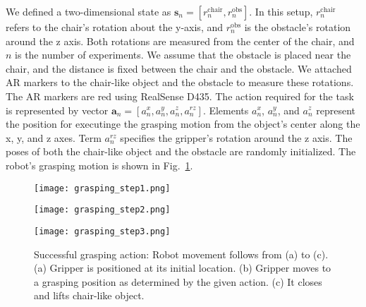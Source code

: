 \documentclass[sn-mathphys-num]{sn-jnl}
\begin{document}
We defined a two-dimensional state as $\mathbf{s}_{n}=[r^\mathrm{chair}_n, r^\mathrm{obs}_n]$.
In this setup, $r^{\mathrm{chair}}_n$ refers to the chair's rotation about the y-axis, and $r^\mathrm{obs}_n$ is the obstacle's rotation around the z axis. Both rotations are measured from the center of the chair, and $n$ is the number of experiments.
We assume that the obstacle is placed near the chair, and the distance is fixed between the chair and the obstacle.
We attached AR markers to the chair-like object and the obstacle to measure these rotations.
The AR markers are red using RealSense D435.
The action required for the task is represented by vector $\mathbf{a}_n=[a^x_n, a^y_n, a^z_n, a^{rz}_n]$.
Elements $a^x_n$, $a^y_n$, and $a^z_n$ represent the position for executinge the grasping motion from the object's center along the x, y, and z axes.
Term $a^{rz}_n$ specifies the gripper's rotation around the z axis.
The poses of both the chair-like object and the obstacle are randomly initialized.
The robot's grasping motion is shown in Fig.~\ref{fig:grasping:grasping}.


\begin{figure}[t]
    \centering
    \begin{minipage}[b]{0.32\linewidth}
        \centering
        \texttt{[image: grasping\_step1.png]}
        \label{fig:grasping:grasping:a}
    \end{minipage}
    \begin{minipage}[b]{0.32\linewidth}
        \centering
        \texttt{[image: grasping\_step2.png]}
        \label{fig:grasping:grasping:b}
    \end{minipage}
    \begin{minipage}[b]{0.32\linewidth}
        \centering
        \texttt{[image: grasping\_step3.png]}
        \label{fig:grasping:grasping:c}
    \end{minipage}
    \vspace{-2mm}
    \caption{Successful grasping action: Robot movement follows from (a) to (c). (a) Gripper is positioned at its initial location. (b) Gripper moves to a grasping position as determined by the given action. (c) It closes and lifts chair-like object.}
    \label{fig:grasping:grasping}
\end{figure}
\end{document}
